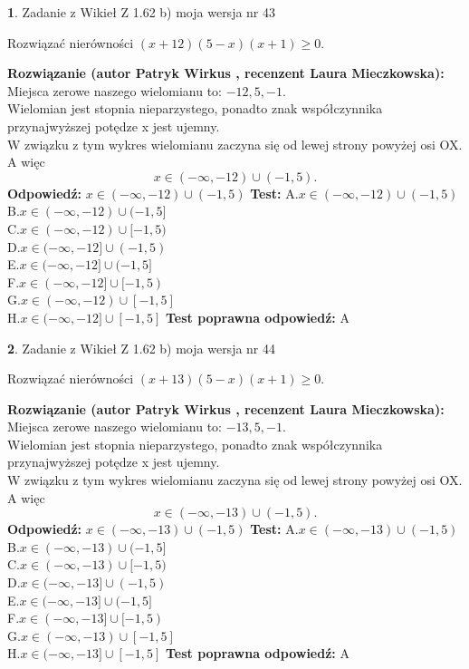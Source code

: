 \documentclass[12pt, a4paper]{article}
\theoremstyle{definition} %
\newtheorem{zad}{}
\newcommand{\zadStart}[1]{\begin{zad}#1\newline}
\newcommand{\zadStop}{\end{zad}}
\newcommand{\rozwStart}[2]{\noindent \textbf{Rozwiązanie (autor #1 , recenzent #2): }\newline}
\newcommand{\rozwStop}{\newline}
\newcommand{\odpStart}{\noindent \textbf{Odpowiedź:}\newline}
\newcommand{\odpStop}{\newline}
\newcommand{\testStart}{\noindent \textbf{Test:}\newline}
\newcommand{\testStop}{\newline}
\newcommand{\kluczStart}{\noindent \textbf{Test poprawna odpowiedź:}\newline}
\newcommand{\kluczStop}{\newline}
\begin{document}
\zadStart{Zadanie z Wikieł Z 1.62 b) moja wersja nr 43}

Rozwiązać nierówności $(x+12)(5-x)(x+1)\ge0$.
\zadStop
\rozwStart{Patryk Wirkus}{Laura Mieczkowska}
Miejsca zerowe naszego wielomianu to: $-12, 5, -1$.\\
Wielomian jest stopnia nieparzystego, ponadto znak współczynnika przy\linebreak najwyższej potędze x jest ujemny.\\ W związku z tym wykres wielomianu zaczyna się od lewej strony powyżej osi OX. A więc $$x \in (-\infty,-12) \cup (-1,5).$$
\rozwStop
\odpStart
$x \in (-\infty,-12) \cup (-1,5)$
\odpStop
\testStart
A.$x \in (-\infty,-12) \cup (-1,5)$\\
B.$x \in (-\infty,-12) \cup (-1,5]$\\
C.$x \in (-\infty,-12) \cup [-1,5)$\\
D.$x \in (-\infty,-12] \cup (-1,5)$\\
E.$x \in (-\infty,-12] \cup (-1,5]$\\
F.$x \in (-\infty,-12] \cup [-1,5)$\\
G.$x \in (-\infty,-12) \cup [-1,5]$\\
H.$x \in (-\infty,-12] \cup [-1,5]$
\testStop
\kluczStart
A
\kluczStop



\zadStart{Zadanie z Wikieł Z 1.62 b) moja wersja nr 44}

Rozwiązać nierówności $(x+13)(5-x)(x+1)\ge0$.
\zadStop
\rozwStart{Patryk Wirkus}{Laura Mieczkowska}
Miejsca zerowe naszego wielomianu to: $-13, 5, -1$.\\
Wielomian jest stopnia nieparzystego, ponadto znak współczynnika przy\linebreak najwyższej potędze x jest ujemny.\\ W związku z tym wykres wielomianu zaczyna się od lewej strony powyżej osi OX. A więc $$x \in (-\infty,-13) \cup (-1,5).$$
\rozwStop
\odpStart
$x \in (-\infty,-13) \cup (-1,5)$
\odpStop
\testStart
A.$x \in (-\infty,-13) \cup (-1,5)$\\
B.$x \in (-\infty,-13) \cup (-1,5]$\\
C.$x \in (-\infty,-13) \cup [-1,5)$\\
D.$x \in (-\infty,-13] \cup (-1,5)$\\
E.$x \in (-\infty,-13] \cup (-1,5]$\\
F.$x \in (-\infty,-13] \cup [-1,5)$\\
G.$x \in (-\infty,-13) \cup [-1,5]$\\
H.$x \in (-\infty,-13] \cup [-1,5]$
\testStop
\kluczStart
A
\kluczStop
\end{document}
